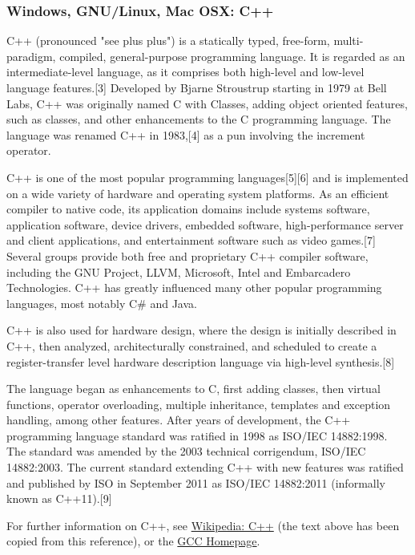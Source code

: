 \newpage
\subsubsection{Windows, GNU/Linux, Mac OSX: C++}
C++ (pronounced "see plus plus") is a statically typed, free-form, multi-paradigm, compiled, general-purpose programming language. It is regarded as an intermediate-level language, as it comprises both high-level and low-level language features.[3] Developed by Bjarne Stroustrup starting in 1979 at Bell Labs, C++ was originally named C with Classes, adding object oriented features, such as classes, and other enhancements to the C programming language. The language was renamed C++ in 1983,[4] as a pun involving the increment operator.

\vpara
C++ is one of the most popular programming languages[5][6] and is implemented on a wide variety of hardware and operating system platforms. As an efficient compiler to native code, its application domains include systems software, application software, device drivers, embedded software, high-performance server and client applications, and entertainment software such as video games.[7] Several groups provide both free and proprietary C++ compiler software, including the GNU Project, LLVM, Microsoft, Intel and Embarcadero Technologies. C++ has greatly influenced many other popular programming languages, most notably C\# and Java.

\vpara
C++ is also used for hardware design, where the design is initially described in C++, then analyzed, architecturally constrained, and scheduled to create a register-transfer level hardware description language via high-level synthesis.[8]

\vpara
The language began as enhancements to C, first adding classes, then virtual functions, operator overloading, multiple inheritance, templates and exception handling, among other features. After years of development, the C++ programming language standard was ratified in 1998 as ISO/IEC 14882:1998. The standard was amended by the 2003 technical corrigendum, ISO/IEC 14882:2003. The current standard extending C++ with new features was ratified and published by ISO in September 2011 as ISO/IEC 14882:2011 (informally known as C++11).[9]

\vpara
For further information on C++, see \href{http://en.wikipedia.org/wiki/C\%2B\%2B}{Wikipedia: C++} (the text above has been copied from this reference), or the  \href{http://gcc.gnu.org/}{GCC Homepage}.


